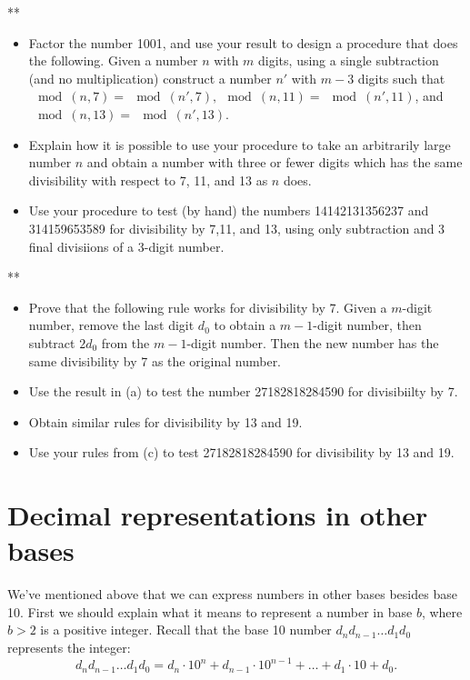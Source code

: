 \begin{exercise}{}**
\begin{itemize}
\item
Factor the number 1001, and use your result to design a procedure that does the following.  Given a number $n$ with $m$ digits, using a single subtraction (and no multiplication)  construct a number $n'$ with $m-3$ digits such that $ \mod(n,7) = \mod(n',7), \mod(n,11) = \mod(n',11)$, and $\mod(n,13) = \mod(n',13)$.  
\item
Explain how it is possible to use your procedure to take an arbitrarily large number $n$ and obtain a number with three or fewer digits which has the same divisibility with respect to 7, 11, and 13 as $n$ does.
\item
Use your procedure to test (by hand)  the numbers 14142131356237 and 314159653589 for divisibility by 7,11, and 13, using only subtraction and 3 final divisiions of a 3-digit number.
\end{itemize}
\end{exercise}

\begin{exercise}{}**
\begin{itemize}
\item
Prove that the following rule works for divisibility by 7.  Given a $m$-digit number, remove the last digit $d_0$ to obtain a $m-1$-digit number, then subtract $2d_0$ from the $m-1$-digit number.  Then the new number has the same divisibility by 7 as the original number.
\item
Use the result in (a) to test the number 27182818284590 for divisibiilty by 7.
\item
Obtain similar rules for divisibility by 13 and 19.
\item Use your rules from (c) to test 27182818284590 for divisibility by 13 and 19.
\end{itemize}
\end{exercise}


\section{Decimal representations in other bases}
\label{sec:DecimalRepresentationOtherBases}

We've mentioned above that we can express numbers in other bases besides base 10.  First we should explain what 
it means to represent a number in base $b$, where $b>2$ is a positive integer.  Recall that the base 10 number $d_n d_{n-1} \ldots d_1 d_0$ 
represents the integer:
\begin{equation*}
d_n d_{n-1} \ldots d_1 d_0 = d_n \cdot 10^n + d_{n-1}\cdot 10^{n-1} + \ldots + d_1 \cdot 10 + d_0.
\end{equation*}

